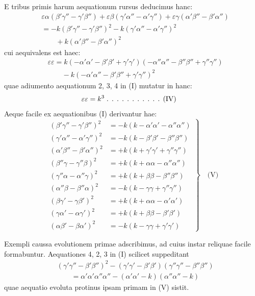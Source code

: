 E tribus primis harum aequationum rursus deducimus hanc:
\[
\begin{aligned}
&\varepsilon\alpha(\beta'\gamma''-\gamma'\beta'')+\varepsilon\beta(\gamma'\alpha''-\alpha'\gamma'')+\varepsilon\gamma(\alpha'\beta''-\beta'\alpha'')\\[6pt]
&=-k(\beta'\gamma''-\gamma'\beta'')^2-k(\gamma'\alpha''-\alpha'\gamma'')^2\\[6pt]
&\qquad{}+k(\alpha'\beta''-\beta'\alpha'')^2
\end{aligned}
\]
cui aequivalens est haec:
\[
\begin{aligned}
&\varepsilon\varepsilon=k(-\alpha'\alpha'-\beta'\beta'+\gamma'\gamma')(-\alpha''\alpha''-\beta''\beta''+\gamma''\gamma'')\\[6pt]
&\qquad{}-k(-\alpha'\alpha''-\beta'\beta''+\gamma'\gamma'')^2
\end{aligned}
\]
quae adiumento aequationum 2, 3, 4 in (I) mutatur in hanc:
\[
\begin{aligned}
&\varepsilon\varepsilon=k^3\;\ldotp\;\ldotp\;\ldotp\;\ldotp\;\ldotp\;\ldotp\;\ldotp\;\ldotp\;\ldotp\;\ldotp\;\ldotp\;\text{(IV)}
\end{aligned}
\]
Aeque facile ex aequationibus (I) derivantur hae:
\[
\left.\begin{aligned}
(\beta'\gamma''-\gamma'\beta'')^2&=-k(k-\alpha'\alpha'-\alpha''\alpha'')\\[5pt]
(\gamma'\alpha''-\alpha'\gamma'')^2&=-k(k-\beta'\beta'-\beta''\beta'')\\[5pt]
(\alpha'\beta''-\beta'\alpha'')^2&=+k(k+\gamma'\gamma'+\gamma''\gamma'')\\[5pt]
(\beta''\gamma-\gamma''\beta)^2&=+k(k+\alpha\alpha-\alpha''\alpha'')\\[5pt]
(\gamma''\alpha-\alpha''\gamma)^2&=+k(k+\beta\beta-\beta''\beta'')\\[5pt]
(\alpha''\beta-\beta''\alpha)^2&=-k(k-\gamma\gamma+\gamma''\gamma'')\\[5pt]
(\beta\gamma'-\gamma\beta')^2&=+k(k+\alpha\alpha-\alpha'\alpha')\\[5pt]
(\gamma\alpha'-\alpha\gamma')^2&=+k(k+\beta\beta-\beta'\beta')\\[5pt]
(\alpha\beta'-\beta\alpha')^2&=-k(k-\gamma\gamma+\gamma'\gamma')
\end{aligned}\right\}\quad\text{(V)}
\]

Exempli caussa evolutionem primae adscribimus, ad cuius instar reliquae
facile formabuntur. Aequationes 4, 2, 3 in (I) scilicet suppeditant
\[
\begin{aligned}
&(\gamma'\gamma''-\beta'\beta'')^2-(\gamma'\gamma'-\beta'\beta')(\gamma''\gamma''-\beta''\beta'')\\[6pt]
&\qquad{}=\alpha'\alpha'\alpha''\alpha''-(\alpha'\alpha'-k)(\alpha''\alpha''-k)
\end{aligned}
\]
quae aequatio evoluta protinus ipsam primam in (V) sistit.

